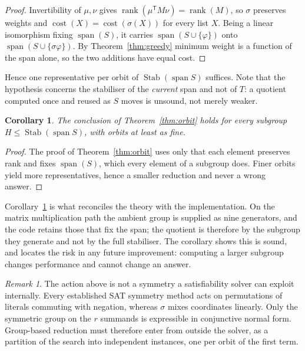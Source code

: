 \documentclass[11pt,reqno]{amsart}
\theoremstyle{plain}
\newtheorem{corollary}[theorem]{Corollary}
\theoremstyle{definition}
\theoremstyle{remark}
\newtheorem{remark}[theorem]{Remark}
\newcommand{\rk}{\operatorname{rank}}
\newcommand{\spn}{\operatorname{span}}
\newcommand{\cost}{\operatorname{cost}}
\newcommand{\Stab}{\operatorname{Stab}}
\begin{document}
\begin{proof}
Invertibility of $\mu,\nu$ gives $\rk(\mu^{\mathsf T}M\nu)=\rk(M)$, so $\sigma$
preserves weights and $\cost(X)=\cost(\sigma(X))$ for every list $X$. Being a
linear isomorphism fixing $\spn(S)$, it carries $\spn(S\cup\{\varphi\})$ onto
$\spn(S\cup\{\sigma\varphi\})$. By Theorem~\ref{thm:greedy} minimum weight is a
function of the span alone, so the two additions have equal cost.
\end{proof}

Hence one representative per orbit of $\Stab(\spn S)$ suffices. Note that the
hypothesis concerns the stabiliser of the \emph{current} span and not of $T$: a
quotient computed once and reused as $S$ moves is unsound, not merely weaker.

\begin{corollary}\label{cor:subgroup}
The conclusion of Theorem~\ref{thm:orbit} holds for every subgroup
$H\le \Stab(\spn S)$, with orbits at least as fine.
\end{corollary}

\begin{proof}
The proof of Theorem~\ref{thm:orbit} uses only that each element preserves rank
and fixes $\spn(S)$, which every element of a subgroup does. Finer orbits yield
more representatives, hence a smaller reduction and never a wrong answer.
\end{proof}

Corollary~\ref{cor:subgroup} is what reconciles the theory with the
implementation. On the matrix multiplication path the ambient group is supplied
as nine generators, and the code retains those that fix the span; the quotient is
therefore by the subgroup they generate and not by the full stabiliser. The
corollary shows this is sound, and locates the risk in any future improvement:
computing a larger subgroup changes performance and cannot change an answer.

\begin{remark}
The action above is not a symmetry a satisfiability solver can exploit
internally. Every established SAT symmetry method acts on permutations of
literals commuting with negation, whereas $\sigma$ mixes coordinates linearly.
Only the symmetric group on the $r$ summands is expressible in conjunctive normal
form. Group-based reduction must therefore enter from outside the solver, as a
partition of the search into independent instances, one per orbit of the first
term.
\end{remark}
\end{document}
